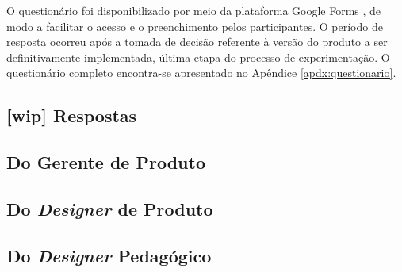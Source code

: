 O questionário foi disponibilizado por meio da plataforma Google Forms \cite{forms}, de modo a facilitar o acesso e o preenchimento pelos participantes. O período de resposta ocorreu após a tomada de decisão referente à versão do produto a ser definitivamente implementada, última etapa do processo de experimentação. O questionário completo encontra-se apresentado no Apêndice \ref{apdx:questionario}.


\subsection{[wip] Respostas}

\subsection{Do Gerente de Produto}
\subsection{Do \textit{Designer} de Produto}
\subsection{Do \textit{Designer} Pedagógico}

